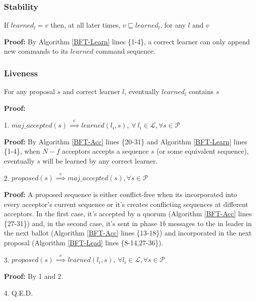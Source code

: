 \subsubsection{Stability}
\begin{theorem}
If $learned_l = v$ then, at all later times, $v \sqsubseteq learned_l$, for any $l$ and $v$ \par \label{S-T1}
\end{theorem} 
\textbf{Proof:} By Algorithm \ref{BFT-Learn} lines \{1-4\}, a correct learner can only append new commands to its $learned$ command sequence.

\subsubsection{Liveness}
\begin{theorem}
For any proposal $s$ and correct learner $l$, eventually $learned_l$ contains $s$ \label{L-T1} \par
\end{theorem} 
\textbf{Proof:} \par
1. $maj\_accepted(s) \overset{e}{\implies} learned(l_i,s),\ \forall\ l_i \in \mathcal{L},\forall s \in \mathcal{P}$ \par
\indent\indent\parbox{\linewidth}{\textbf{Proof:} By Algorithm \ref{BFT-Acc} lines \{20-31\} and Algorithm \ref{BFT-Learn} lines \{1-4\}, when $N-f$ acceptors accepts a sequence $s$ (or some equivalent sequence), eventually $s$ will be learned by any correct learner.}\par
2. $proposed(s) \overset{e}{\implies} maj\_accepted(s), \forall s \in \mathcal{P}$ \par
\indent\indent\parbox{\linewidth}{\textbf{Proof:} A proposed sequence is either conflict-free when its incorporated into every acceptor's current sequence or it's creates conflicting sequences at different acceptors. In the first case, it's accepted by a quorum (Algorithm \ref{BFT-Acc} lines \{27-31\}) and, in the second case, it's sent in phase $1b$ messages to the in leader in the next ballot (Algorithm \ref{BFT-Acc} lines \{13-18\}) and incorporated in the next proposal (Algorithm \ref{BFT-Lead} lines \{8-14,27-36\}).} \par
3. $proposed(s) \overset{e}{\implies} learned(l_i,s),\ \forall l_i \in \mathcal{L}, \forall s \in \mathcal{P}$ \par
\indent\indent\textbf{Proof:} By 1 and 2. \par
4. Q.E.D.